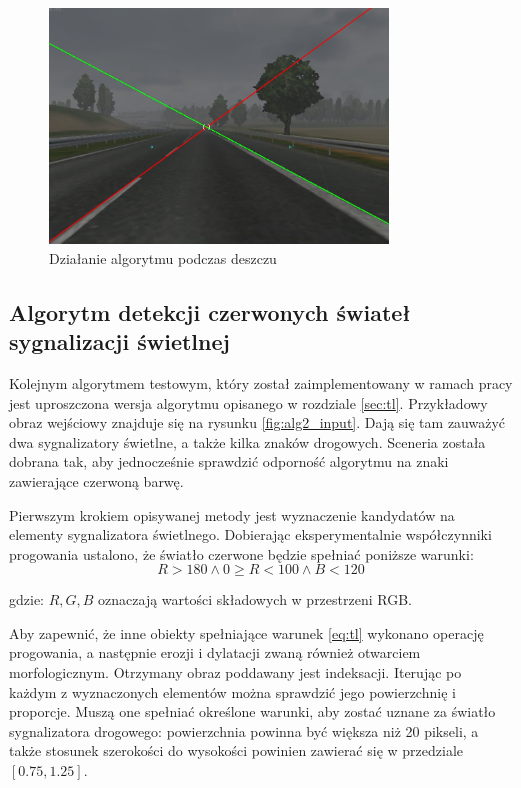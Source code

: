 \begin{figure}
  \centering
  \includegraphics[width=9cm]{img/alg1_rain.jpg}
  \caption{Działanie algorytmu podczas deszczu}
  \label{fig:alg1_rain}
\end{figure}


\subsection{Algorytm detekcji czerwonych świateł sygnalizacji świetlnej} %

Kolejnym algorytmem testowym, który został zaimplementowany w ramach pracy jest uproszczona wersja algorytmu opisanego w rozdziale \ref{sec:tl}. %
Przykładowy obraz wejściowy znajduje się na rysunku \ref{fig:alg2_input}. 
Dają się tam zauważyć dwa sygnalizatory świetlne, a także kilka znaków drogowych. 
Sceneria została dobrana tak, aby jednocześnie sprawdzić odporność algorytmu na znaki zawierające czerwoną barwę.

Pierwszym krokiem opisywanej metody jest wyznaczenie kandydatów na elementy sygnalizatora świetlnego. 
Dobierając eksperymentalnie współczynniki progowania ustalono, że światło czerwone będzie spełniać poniższe warunki:
\begin{equation}
\label{eq:tl}
R>180 \wedge 0 \geq R<100 \wedge B < 120
\end{equation}

gdzie: $R, G, B$ oznaczają wartości składowych w przestrzeni RGB.

Aby zapewnić, że inne obiekty spełniające warunek \ref{eq:tl} wykonano operację progowania, a następnie erozji i dylatacji zwaną również otwarciem morfologicznym. %
Otrzymany obraz poddawany jest indeksacji. %
Iterując po każdym z wyznaczonych elementów można sprawdzić jego powierzchnię i proporcje. Muszą one spełniać określone warunki, aby zostać uznane za światło sygnalizatora drogowego: powierzchnia powinna być większa niż 20 pikseli, a także stosunek szerokości do wysokości powinien zawierać się w przedziale $[0.75, 1.25]$.

